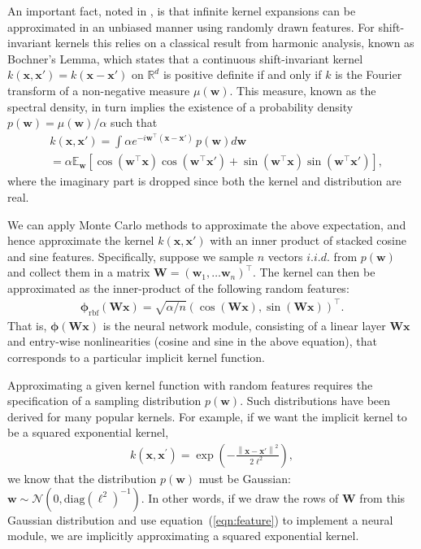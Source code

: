 \documentclass[10pt,twocolumn,letterpaper]{article}
\newcommand{\real}{\mathbb{R}}
\newcommand{\myvec}[1]{\mathbf{#1}}
\newcommand{\myvecsym}[1]{\boldsymbol{#1}}
\newcommand{\vphi}{\myvecsym{\phi}}
\newcommand{\vw}{\myvec{w}}
\newcommand{\vx}{\myvec{x}}
\newcommand{\vW}{\myvec{W}}
\newcommand{\E}{\mathbb{E}}
\newcommand{\diag}{\mathrm{diag}}
\newcommand{\rbr}[1]{\left(#1\right)}
\newcommand{\nbr}[1]{\left\|#1\right\|}
\begin{document}
An important fact, noted in
\cite{Rahimi:2007}, is that infinite kernel expansions can be approximated
in an unbiased manner using randomly drawn features. For
shift-invariant kernels this relies on a classical result from harmonic
analysis, known as Bochner's Lemma, which states that 
  a continuous shift-invariant kernel $k(\vx,\vx')=k(\vx-\vx')$ on $\real^d$
  is positive definite if and only if $k$ is the Fourier transform of a
  non-negative measure $\mu(\vw)$.
This measure, known as the spectral density, in turn implies the existence of a
probability density $p(\vw)=\mu(\vw)/\alpha$ such that
\begin{align*}
    & k(\vx,\vx') =  \int \alpha e^{-i\vw^\top(\vx-\vx')} \,p(\vw) d\vw \\
    & = \alpha \E_\vw[\cos(\vw^\top\vx)\cos(\vw^\top\vx') 
      + \sin(\vw^\top\vx)\sin(\vw^\top\vx') ],
\end{align*}
where the imaginary part is dropped since both the kernel and distribution are
real.  

We can apply Monte Carlo methods to approximate the above expectation, and hence approximate the kernel $k(\vx,\vx')$ with an inner product of stacked cosine and sine features. 
Specifically,
suppose we sample $n$ vectors $i.i.d.$ from $p(\vw)$ and collect them
in a matrix $\vW=(\vw_1,\dots \vw_n)^\top$. The kernel can then be
approximated as the inner-product of the following random features:
\begin{align}
\vphi_\mathrm{rbf}(\vW\vx) = \sqrt{\alpha/n}\rbr{\cos(\vW\vx), \sin(\vW\vx)}^\top.
\label{eqn:feature}
\end{align}
That is, $\vphi(\vW\vx)$ is the neural network module, consisting of a linear layer $\vW\vx$ and entry-wise nonlinearities (cosine and sine in the above equation), that corresponds to a particular implicit kernel function.  

Approximating a given kernel function with random features requires the specification of a sampling distribution $p(\vw)$. Such distributions have
been derived for many popular kernels. For example, if we want the implicit kernel to be a squared exponential kernel,
\begin{align}
  k(\vx, \vx^{\prime}) = \exp\rbr{-\frac{\nbr{\vx-\vx'}^2}{2\ell^2}},
\end{align}
we know that the distribution $p(\vw)$ must be Gaussian: $\vw \sim \mathcal N(0, \diag(\boldsymbol\ell^2)^{-1})$. In other words, if we draw the rows of $\vW$ from this Gaussian distribution and use equation~(\ref{eqn:feature}) to implement a neural module, we are implicitly approximating a squared exponential kernel.
\end{document}
